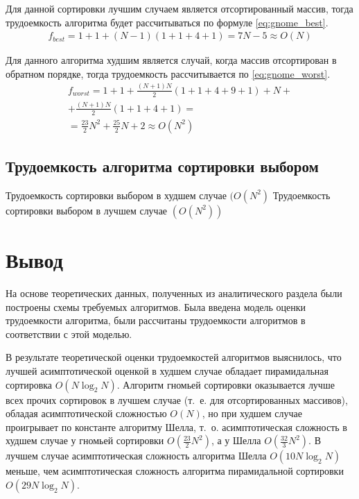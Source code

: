 Для данной сортировки лучшим случаем является отсортированный массив, тогда трудоемкость алгоритма будет рассчитываться по формуле \eqref{eq:gnome_best}.
\begin{equation}
	\label{eq:gnome_best}
	\begin{gathered}
		f_{best} = 1 + 1 + (N - 1)(1 + 1 + 4 + 1) = 7 N - 5 \approx O(N)
	\end{gathered}
\end{equation}

Для данного алгоритма худшим является случай, когда массив отсортирован в обратном порядке, тогда трудоемкость рассчитывается по \eqref{eq:gnome_worst}.
\begin{equation}
	\label{eq:gnome_worst}
	\begin{gathered}
		f_{worst} = 1 + 1 + \frac{(N + 1)N}{2}(1 + 1 + 4 + 9 + 1) + N + \\
		+ \frac{(N + 1)N}{2}(1 + 1 + 4 + 1) = 
		\\ = \frac{23}{2} N^2 + \frac{25}{2}N + 2 \approx O(N^2)
	\end{gathered}
\end{equation}

\subsection{Трудоемкость алгоритма сортировки выбором}

Трудоемкость сортировки выбором в худшем случае $(O(N^2)$
Трудоемкость сортировки выбором в лучшем случае $(O(N^2))$


\section*{Вывод}
На основе теоретических данных, полученных из аналитического раздела были построены схемы требуемых алгоритмов. 
Была введена модель оценки трудоемкости алгоритма, были рассчитаны трудоемкости алгоритмов в соответствии с этой моделью.

В результате теоретической оценки трудоемкостей алгоритмов выяснилось, что лучшей асимптотической оценкой в худшем случае обладает пирамидальная сортировка $O(N \log_{2}N)$. 
Алгоритм гномьей сортировки оказывается лучше всех прочих сортировок в лучшем случае (т.~е. для отсортированных массивов), обладая асимптотической сложностью $O(N)$, но при худшем случае проигрывает по константе алгоритму Шелла, т.~о. асимптотическая сложность в худшем случае у гномьей сортировки $O(\frac{23}{2}N^2)$, а у Шелла $O(\frac{32}{3} N ^ 2)$. 
В лучшем случае асимптотическая сложность алгоритма Шелла $O(10N\log_2N)$ меньше, чем асимптотическая сложность алгоритма пирамидальной сортировки $O(29N\log_2N)$.